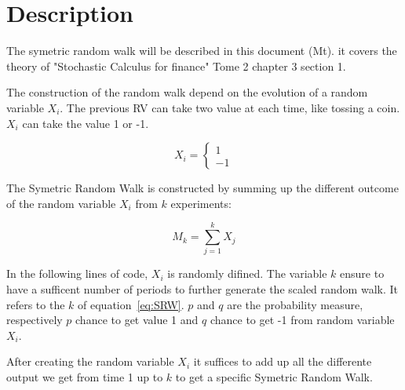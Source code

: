\documentclass{article}\usepackage[]{graphicx}\usepackage[]{color}
\makeatletter
\newenvironment{kframe}{%
 \def\at@end@of@kframe{}%
 \ifinner\ifhmode%
  \def\at@end@of@kframe{\end{minipage}}%
  \begin{minipage}{\columnwidth}%
 \fi\fi%
 \def\FrameCommand##1{\hskip\@totalleftmargin \hskip-\fboxsep
 \colorbox{shadecolor}{##1}\hskip-\fboxsep
     \hskip-\linewidth \hskip-\@totalleftmargin \hskip\columnwidth}%
 \MakeFramed {\advance\hsize-\width
   \@totalleftmargin\z@ \linewidth\hsize
   \@setminipage}}%
 {\par\unskip\endMakeFramed%
 \at@end@of@kframe}
\newenvironment{knitrout}{}{} %
\makeatother
\begin{document}

\begin{knitrout}
\color{fgcolor}\begin{kframe}


{\ttfamily\noindent\itshape\color{messagecolor}{\#\# Registering fonts with R}}

{\ttfamily\noindent\color{warningcolor}{\#\# Warning: package 'ggplot2' was built under R version 3.3.3}}\end{kframe}
\end{knitrout}


\section{Description}
The symetric random walk will be described in this document (Mt). it covers the theory of "Stochastic Calculus for finance" Tome 2 chapter 3 section 1.

The construction of the random walk depend on the evolution of a random variable $X_i$. The previous RV can take two value at each time, like tossing a coin. $X_i$ can take the value 1 or -1.

\begin{equation}
 \label{eq:Xi}
X_i = 
\left \{{
  \begin{array}{c} 1 \\ -1 \end{array}
  }\right .
\end{equation}
 
The Symetric Random Walk is constructed by summing up the different outcome of the random variable $X_i$ from $k$ experiments:

\begin{equation}
\label{eq:SRW}
M_k = 
\sum_{j=1}^k X_j
\end{equation}

In the following lines of code, $X_i$ is randomly difined. The variable $k$ ensure to have a sufficent number of periods to further generate the scaled random walk.
It refers to the $k$ of equation~\ref{eq:SRW}.
$p$ and $q$ are the probability measure, respectively $p$ chance to get value 1 and $q$ chance to get -1 from random variable $X_i$.

 


After creating the random variable $X_i$ it suffices to add up all the differente output we get from time 1 up to $k$ to get a specific Symetric Random Walk.
\end{document}
